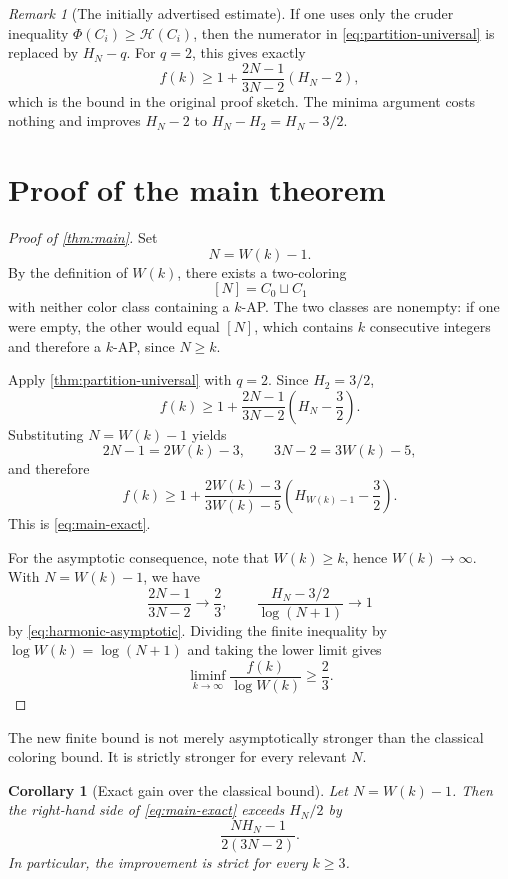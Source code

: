 \documentclass[11pt]{article}
\newtheorem{corollary}[theorem]{Corollary}
\theoremstyle{definition}
\theoremstyle{remark}
\newtheorem{remark}[theorem]{Remark}
\newcommand{\HH}{\mathcal{H}}
\begin{document}
\begin{remark}[The initially advertised estimate]\label{rem:advertised}
If one uses only the cruder inequality $\Phi(C_i)\ge\HH(C_i)$, then the
numerator in \cref{eq:partition-universal} is replaced by $H_N-q$.  For
$q=2$, this gives exactly
\[
 f(k)\ge 1+\frac{2N-1}{3N-2}(H_N-2),
\]
which is the bound in the original proof sketch.  The minima argument costs
nothing and improves $H_N-2$ to $H_N-H_2=H_N-3/2$.
\end{remark}

\section{Proof of the main theorem}

\begin{proof}[Proof of \cref{thm:main}]
Set
\[
 N=W(k)-1.
\]
By the definition of $W(k)$, there exists a two-coloring
\[
 [N]=C_0\sqcup C_1
\]
with neither color class containing a $k$-AP.  The two classes are nonempty:
if one were empty, the other would equal $[N]$, which contains $k$
consecutive integers and therefore a $k$-AP, since $N\ge k$.

Apply \cref{thm:partition-universal} with $q=2$.  Since $H_2=3/2$,
\[
 f(k)
 \ge
 1+\frac{2N-1}{3N-2}\left(H_N-\frac32\right).
\]
Substituting $N=W(k)-1$ yields
\[
 2N-1=2W(k)-3,
 \qquad
 3N-2=3W(k)-5,
\]
and therefore
\[
 f(k)\ge
 1+\frac{2W(k)-3}{3W(k)-5}
 \left(H_{W(k)-1}-\frac32\right).
\]
This is \cref{eq:main-exact}.

For the asymptotic consequence, note that $W(k)\ge k$, hence
$W(k)\to\infty$.  With $N=W(k)-1$, we have
\[
 \frac{2N-1}{3N-2}\longrightarrow\frac23,
 \qquad
 \frac{H_N-3/2}{\log(N+1)}\longrightarrow 1
\]
by \cref{eq:harmonic-asymptotic}.  Dividing the finite inequality by
$\log W(k)=\log(N+1)$ and taking the lower limit gives
\[
 \liminf_{k\to\infty}\frac{f(k)}{\log W(k)}\ge\frac23.
\]
\end{proof}

The new finite bound is not merely asymptotically stronger than the
classical coloring bound.  It is strictly stronger for every relevant
$N$.

\begin{corollary}[Exact gain over the classical bound]\label{cor:exact-gain}
Let $N=W(k)-1$.  Then the right-hand side of \cref{eq:main-exact} exceeds
$H_N/2$ by
\begin{equation}\label{eq:exact-gain}
 \frac{NH_N-1}{2(3N-2)}.
\end{equation}
In particular, the improvement is strict for every $k\ge 3$.
\end{corollary}
\end{document}
